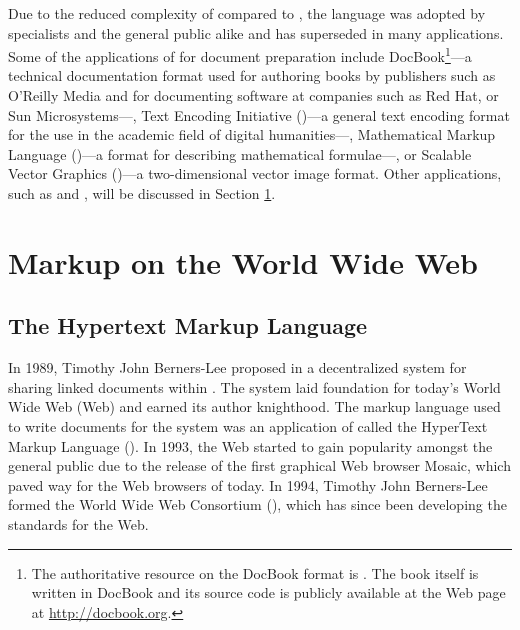 \documentclass{book}
\begin{document}
        Due to the reduced complexity of  compared to
        , the language was adopted by specialists and the general
        public alike and has superseded  in many applications.
        Some of the applications of  for document
        preparation include DocBook\footnote{
          The authoritative resource on the DocBook  format is
          \cite{walsh10}. The book itself is written in DocBook and its source
          code is publicly available at the Web page at
          \url{http://docbook.org}.
        }---a technical documentation format used for authoring books by
        publishers such as O'Reilly Media and for documenting software at
        companies such as Red Hat,  or Sun Microsystems---,
        Text Encoding Initiative ()---a general text encoding
        format for the use in the academic field of digital humanities---,
        Mathematical Markup Language ()---a format for
        describing mathematical formulae---, or Scalable Vector Graphics
        ()---a two-dimensional vector image format. Other
         applications, such as  and
        , will be discussed in Section \ref{sec:www-markup}.
        
      \section{Markup on the World Wide Web}\label{sec:www-markup}
      \subsection{The Hypertext Markup Language}
        In 1989, Timothy John Berners-Lee proposed in \cite{bernerslee89} a
        decentralized system for sharing linked documents within .
        The system laid foundation for today's World Wide Web (Web) and earned
        its author knighthood. The markup language used to write documents for
        the system was an application of  called the HyperText
        Markup Language (). In 1993, the Web started to gain
        popularity amongst the general public due to the release of the first
        graphical Web browser Mosaic, which paved way for the Web browsers of
        today. In 1994, Timothy John Berners-Lee formed the World Wide Web
        Consortium (), which has since been developing the
        standards for the Web.
        
\end{document}

